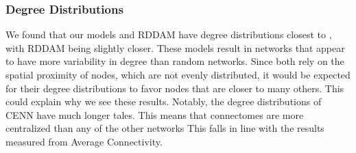 \subsubsection{Degree Distributions} 
We found that our models and RDDAM have degree distributions closest to \ce, with RDDAM being slightly closer. 
These models result in networks that appear to have more variability in degree than random networks. 
Since both rely on the spatial proximity of nodes, which are not evenly distributed, it would be expected for their degree distributions to favor nodes that are closer to many others. 
This could explain why we see these results. 
Notably, the degree distributions of CENN have much longer tales. 
This means that \ce connectomes are more centralized than any of the other networks 
This falls in line with the results measured from Average Connectivity. 